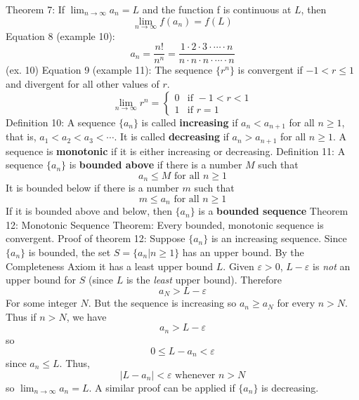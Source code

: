 \documentclass{article}
\begin{document}
        \begin{outline}
        \1 Theorem 7: If \(\lim_{n\to\infty}a_n=L\) and the function f is continuous at $L$, then \[\lim_{n\to\infty}f(a_n)=f(L)\]
        \1 Equation 8 (example 10): \[a_n=\dfrac{n!}{n^n}=\dfrac{1\cdot2\cdot3\cdot\cdots\cdot n}{n\cdot n\cdot n\cdot\cdots\cdot n}\] (ex. 10)
        \1 Equation 9 (example 11): The sequence \(\{r^n\}\) is convergent if \(-1<r\leq 1\) and divergent for all other values of $r$. \[\lim_{n\to\infty}r^n=\begin{cases} 0 & \mbox{if } -1<r<1 \\ 1 & \mbox{if }r=1 \end{cases}\]
        \1 Definition 10: A sequence \(\{a_n\}\) is called \textbf{increasing} if \(a_n<a_{n+1}\) for all \(n\geq 1\), that is, \(a_1<a_2<a_3<\cdots\). It is called \textbf{decreasing} if \(a_n>a_{n+1}\) for all \(n\geq 1\). A sequence is \textbf{monotonic} if it is either increasing or decreasing. 
        \1 Definition 11: A sequence \(\{a_n\}\) is \textbf{bounded above} if there is a number $M$ such that \[a_n\leq M\mbox{    for all }n\geq 1\] It is bounded below if there is a number $m$ such that \[m\leq a_n\text{    for all }n\geq 1\] If it is bounded above and below, then \(\{a_n\}\) is a \textbf{bounded sequence}
        \1 Theorem 12: Monotonic Sequence Theorem: Every bounded, monotonic sequence is convergent. 
        \1 Proof of theorem 12: Suppose \(\{a_n\}\) is an increasing sequence. Since \(\{a_n\}\) is bounded, the set \(S=\{a_n|n\geq 1\}\) has an upper bound. By the Completeness Axiom it has a least upper bound $L$. Given \(\varepsilon>0\), \(L-\varepsilon\) is \textit{not} an upper bound for $S$ (since $L$ is the \textit{least} upper bound). Therefore \[a_N>L-\varepsilon\] For some integer $N$. But the sequence is increasing so \(a_n\geq a_N\) for every \(n>N\). Thus if \(n>N\), we have \[a_n>L-\varepsilon\] so \[0\leq L-a_n<\varepsilon\] since \(a_n\leq L\). Thus, \[|L-a_n|<\varepsilon\text{     whenever }n>N \] so \(\lim_{n\to\infty}a_n=L\). A similar proof can be applied if \(\{a_n\}\) is decreasing. 
    \end{outline}
\end{document}
